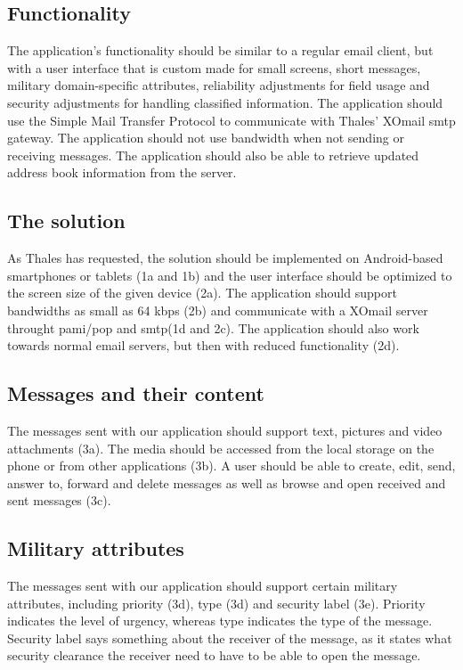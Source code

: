 \subsection{Functionality}
The application's functionality should be similar to a regular email client, but with a user interface that is custom made for small screens, short messages, military domain-specific attributes, reliability adjustments for field usage and security adjustments for handling classified information. The application should use the Simple Mail Transfer Protocol to communicate with Thales' XOmail \gls{smtp} gateway.
\newline
\newline
The application should not use bandwidth when not sending or receiving messages. The application should also be able to retrieve updated address book information from the server.

\subsection{The solution}
As Thales has requested, the solution should be implemented on Android-based smartphones or tablets (1a and 1b) and the user interface should be optimized to the screen size of the given device (2a). The application should support bandwidths as small as 64 kbps (2b) and communicate with a XOmail server throught \gls{pami}/\gls{pop} and \gls{smtp}(1d and 2c). The application should also work towards normal email servers, but then with reduced functionality (2d).

\subsection{Messages and their content}
The messages sent with our application should support text, pictures and video attachments (3a). The media should be accessed from the local storage on the phone or from other applications (3b). A user should be able to create, edit, send, answer to, forward and delete messages as well as browse and open received and sent messages (3c).

\subsection{Military attributes}
The messages sent with our application should support certain military attributes, including priority (3d), type (3d) and security label (3e). Priority indicates the level of urgency, whereas type indicates the type of the message. Security label says something about the receiver of the message, as it states what security clearance the receiver need to have to be able to open the message.


